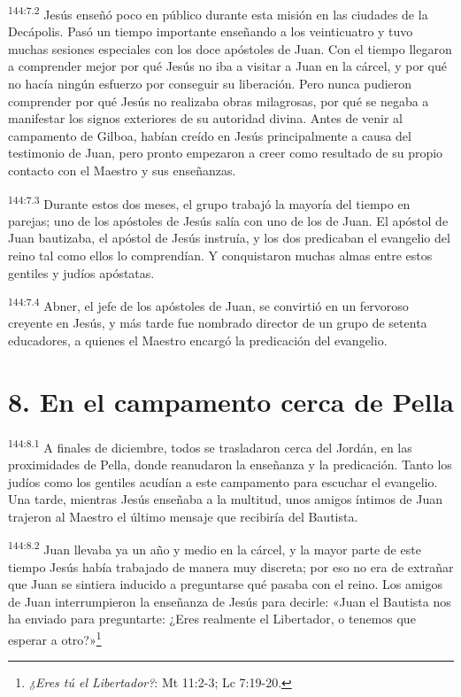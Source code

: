 \par
\textsuperscript{144:7.2} Jesús enseñó poco en público durante esta misión en las ciudades de la Decápolis. Pasó un tiempo importante enseñando a los veinticuatro y tuvo muchas sesiones especiales con los doce apóstoles de Juan. Con el tiempo llegaron a comprender mejor por qué Jesús no iba a visitar a Juan en la cárcel, y por qué no hacía ningún esfuerzo por conseguir su liberación. Pero nunca pudieron comprender por qué Jesús no realizaba obras milagrosas, por qué se negaba a manifestar los signos exteriores de su autoridad divina. Antes de venir al campamento de Gilboa, habían creído en Jesús principalmente a causa del testimonio de Juan, pero pronto empezaron a creer como resultado de su propio contacto con el Maestro y sus enseñanzas.

\par
\textsuperscript{144:7.3} Durante estos dos meses, el grupo trabajó la mayoría del tiempo en parejas; uno de los apóstoles de Jesús salía con uno de los de Juan. El apóstol de Juan bautizaba, el apóstol de Jesús instruía, y los dos predicaban el evangelio del reino tal como ellos lo comprendían. Y conquistaron muchas almas entre estos gentiles y judíos apóstatas.

\par
\textsuperscript{144:7.4} Abner, el jefe de los apóstoles de Juan, se convirtió en un fervoroso creyente en Jesús, y más tarde fue nombrado director de un grupo de setenta educadores, a quienes el Maestro encargó la predicación del evangelio.

\section*{8. En el campamento cerca de Pella}
\par
\textsuperscript{144:8.1} A finales de diciembre, todos se trasladaron cerca del Jordán, en las proximidades de Pella, donde reanudaron la enseñanza y la predicación. Tanto los judíos como los gentiles acudían a este campamento para escuchar el evangelio. Una tarde, mientras Jesús enseñaba a la multitud, unos amigos íntimos de Juan trajeron al Maestro el último mensaje que recibiría del Bautista.

\par
\textsuperscript{144:8.2} Juan llevaba ya un año y medio en la cárcel, y la mayor parte de este tiempo Jesús había trabajado de manera muy discreta; por eso no era de extrañar que Juan se sintiera inducido a preguntarse qué pasaba con el reino. Los amigos de Juan interrumpieron la enseñanza de Jesús para decirle: «Juan el Bautista nos ha enviado para preguntarte: ¿Eres realmente el Libertador, o tenemos que esperar a otro?»\footnote{\textit{¿Eres tú el Libertador?}: Mt 11:2-3; Lc 7:19-20.}

